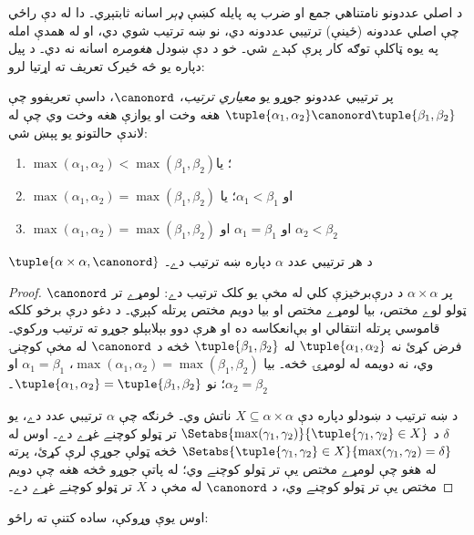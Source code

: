 \documentclass[../../../include/open-logic-section]{subfiles}
\begin{document}


د اصلي عددونو نامتناهي جمع او ضرب په پايله کښې \emph{ډېر} اسانه
ثابتېږي۔ دا له دې راځي چې اصلي عددونه (ځينې) ترتيبي عددونه دي،
نو ښه ترتيب شوي دي، او له همدې امله په يوه ټاکلې توګه کار پرې
کېدے شي۔ خو د دې ښودل \emph{هغومره} اسانه نه دي۔ د پيل دپاره
يو څه ځيرک تعريف ته اړتيا لرو:

\begin{defn}
پر ترتيبي عددونو جوړو يو \emph{معياري ترتيب}، $\canonord$،
داسې تعريفوو چې $\tuple{\alpha_1, \alpha_2} \canonord
\tuple{\beta_1, \beta_2}$ هغه وخت او يوازې هغه وخت وي چې له
لاندې حالتونو يو پېښ شي:
\begin{enumerate}
	\item $\max(\alpha_1, \alpha_2) < \max(\beta_1, \beta_2)$؛ يا
	\item $\max(\alpha_1, \alpha_2) = \max(\beta_1, \beta_2)$ او
	$\alpha_1 < \beta_1$؛ يا
	\item $\max(\alpha_1, \alpha_2) = \max(\beta_1, \beta_2)$ او
	$\alpha_1 = \beta_1$ او $\alpha_2 < \beta_2$
\end{enumerate}
\end{defn}

\begin{lem}
$\tuple{\alpha \times \alpha, \canonord}$ د هر ترتيبي عدد
$\alpha$ دپاره ښه ترتيب دے۔
\end{lem}

\begin{proof}
$\canonord$ پر $\alpha \times \alpha$ د درې‌برخيزې کلي
له مخې يو کلک ترتيب دے: لومړے تر ټولو لوے مختص،
بيا لومړے مختص او بيا دويم مختص پرتله کېږي۔ د دغو
درې برخو کلکه قاموسي پرتله انتقالي او بې‌انعکاسه ده او
هرې دوو بېلابېلو جوړو ته ترتيب ورکوي۔ فرض کړئ نه $\tuple{\alpha_1,
\alpha_2}$ له $\tuple{\beta_1,
\beta_2}$ څخه د $\canonord$ له مخې کوچنۍ وي، نه دويمه له
لومړۍ څخه۔ بيا $\max(\alpha_1,
\alpha_2) = \max(\beta_1, \beta_2)$، $\alpha_1 = \beta_1$
او $\alpha_2 = \beta_2$؛ نو $\tuple{\alpha_1, \alpha_2} =
\tuple{\beta_1,  \beta_2}$۔

د ښه ترتيب د ښودلو دپاره دې $X \subseteq \alpha\times\alpha$
ناتش وي۔ څرنګه چې $\alpha$ ترتيبي عدد دے، يو $\delta$ د
$\Setabs{\max(\gamma_1, \gamma_2)}{\tuple{\gamma_1,
\gamma_2} \in X}$ تر ټولو کوچنے غړے دے۔ اوس له
$\Setabs{\tuple{\gamma_1,\gamma_2} \in X}{\max(\gamma_1, \gamma_2) =
\delta}$ څخه ټولې جوړې لرې کړئ، پرته له هغو چې لومړے مختص يې
تر ټولو کوچنے وي؛ له پاتې جوړو څخه هغه چې دويم مختص يې تر
ټولو کوچنے وي، د $\canonord$ له مخې د $X$ تر ټولو کوچنے غړے دے۔
\end{proof}
\noindent
اوس يوې وړوکې، ساده کتنې ته راځو:
\end{document}
